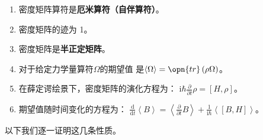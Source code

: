 \begin{enumerate}
\item 密度矩阵算符是\textbf{厄米算符（自伴算符）}。
\item 密度矩阵的迹为 1。
\item 密度矩阵是\textbf{半正定矩阵}。
\item 对于给定力学量算符$\Omega$的期望值
    是$\left\langle \Omega \right\rangle = \opn{tr}\left(\rho\Omega\right)$。
\item 在薛定谔绘景下，密度矩阵的演化方程为：
    $\mathrm{i}\hbar \frac{\partial}{\partial t} \rho= \left[ H, \rho \right]$。
\item 期望值随时间变化的方程为：
    $\frac{\mathrm{d}}{\mathrm{d}t}\left\langle B \right\rangle = \left\langle \frac{\partial}{\partial t} B \right\rangle + \frac{1}{\mathrm{i}\hbar}\left\langle \left[ B, H \right]\right\rangle$。
\end{enumerate}


以下我们逐一证明这几条性质。

